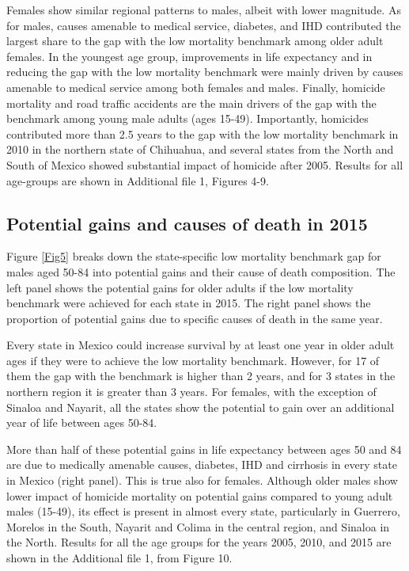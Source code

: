 \documentclass{bmcart}
\begin{document}
Females show similar regional patterns to males, albeit with lower magnitude. As for males, causes amenable to medical service, diabetes, and IHD contributed the largest share to the gap with the low mortality benchmark among older adult females. In the youngest age group, improvements in life expectancy and in reducing the gap with the low mortality benchmark were mainly driven by causes amenable to medical service among both females and males. Finally, homicide mortality and road traffic accidents are the main drivers of the gap with the benchmark among young male adults (ages 15-49). Importantly, homicides contributed more than 2.5 years to the gap with the low mortality benchmark in 2010 in the northern state of Chihuahua, and several states from the North and South of Mexico showed substantial impact of homicide after 2005. Results for all age-groups are shown in Additional file 1, Figures 4-9.


\subsection*{Potential gains and causes of death in 2015}

Figure \ref{Fig5} breaks down the state-specific low mortality benchmark gap for males aged 50-84 into potential gains and their cause of death composition. The left panel shows the potential gains for older adults if the low mortality benchmark were achieved for each state in 2015. The right panel shows the proportion of potential gains due to specific causes of death in the same year.

Every state in Mexico could increase survival by at least one year in older adult ages if they were to achieve the low mortality benchmark. However, for 17 of them the gap with the benchmark is higher than 2 years, and for 3 states in the northern region it is greater than 3 years. For females, with the exception of Sinaloa and Nayarit, all the states show the potential to gain over an additional year of life between ages 50-84.

More than half of these potential gains in life expectancy between ages 50 and 84 are due to medically amenable causes, diabetes, IHD and cirrhosis in every state in Mexico (right panel). This is true also for females. Although older males show lower impact of homicide mortality on potential gains compared to young adult males (15-49), its effect is present in almost every state, particularly in Guerrero, Morelos in the South, Nayarit and Colima in the central region, and Sinaloa in the North. Results for all the age groups for the years 2005, 2010, and 2015 are shown in the Additional file 1, from Figure 10. \\
\end{document}
